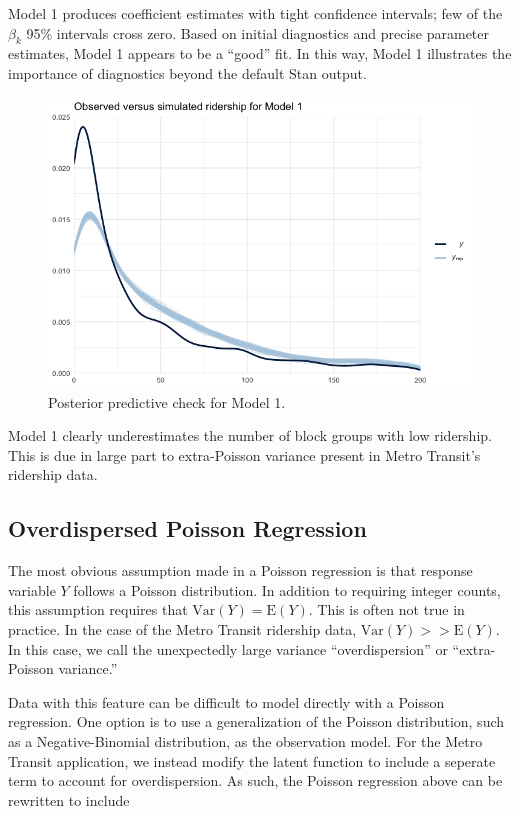 \documentclass[
]{article}
\begin{document}
Model 1 produces coefficient estimates with tight confidence intervals;
few of the \(\beta_k\) 95\% intervals cross zero. Based on initial
diagnostics and precise parameter estimates, Model 1 appears to be a
``good'' fit. In this way, Model 1 illustrates the importance of
diagnostics beyond the default Stan output.

\begin{figure}[H]
  \centering
  \includegraphics[width = 6in]{ppcheck_mod1.png}
  \caption{Posterior predictive check for Model 1.}
\end{figure}

Model 1 clearly underestimates the number of block groups with low
ridership. This is due in large part to extra-Poisson variance present
in Metro Transit's ridership data.

\hypertarget{overdispersed-poisson-regression}{%
\subsection{Overdispersed Poisson
Regression}\label{overdispersed-poisson-regression}}

The most obvious assumption made in a Poisson regression is that
response variable \(Y\) follows a Poisson distribution. In addition to
requiring integer counts, this assumption requires that
\(\text{Var}(Y) = \text{E}(Y)\). This is often not true in practice. In
the case of the Metro Transit ridership data,
\(\text{Var}(Y) >>\text{E}(Y)\). In this case, we call the unexpectedly
large variance ``overdispersion'' or ``extra-Poisson variance.''

Data with this feature can be difficult to model directly with a Poisson
regression. One option is to use a generalization of the Poisson
distribution, such as a Negative-Binomial distribution, as the
observation model. For the Metro Transit application, we instead modify
the latent function to include a seperate term to account for
overdispersion. As such, the Poisson regression above can be rewritten
to include
\end{document}

